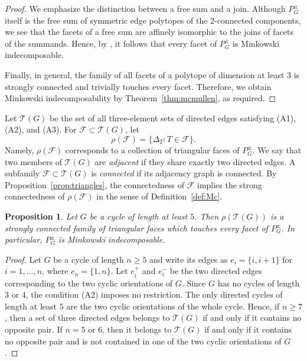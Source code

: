 \documentclass[11pt,a4paper]{amsart}
\newtheorem{proposition}[theorem]{Proposition}
\theoremstyle{definition}
\theoremstyle{remark}
\newcommand{\Tc}{{\mathcal T}}
\newcommand{\Fc}{{\mathcal F}}
\begin{document}
{\begin{proof}
We emphasize the distinction between a free sum and a join. 
Although $P_G^\pm$ itself is the free sum of symmetric edge polytopes of the $2$-connected components, 
we see that the facets of a free sum are affinely isomorphic to the joins of facets of the summands. 
Hence, by \cite[Theorem~3]{McM}, it follows that every facet of $P_G^\pm$ is Minkowski indecomposable. 

Finally, in general, the family of all facets of a polytope of dimension at least $3$ is strongly connected and trivially touches every facet. 
Therefore, we obtain Minkowski indecomposability by Theorem~\ref{thm:mcmullen}, as required.  
\end{proof}


\medskip


Let $\Tc(G)$ be the set of all three-element sets of directed edges satisfying (A1), (A2), and (A3). 
For $\Fc\subset \Tc(G)$, let \[\rho(\Fc)=\{\Delta_T:T\in\Fc\}.\]
Namely, $\rho(\Fc)$ corresponds to a collection of triangular faces of $P_G^\pm$. 
We say that two members of $\Tc(G)$ are \emph{adjacent} if they share exactly two directed edges. 
A subfamily $\Fc\subset \Tc(G)$ is \emph{connected} if its adjacency graph is connected. 
By Proposition~\ref{prop:triangles}, the connectedness of $\Fc$ implies the strong connectedness of $\rho(\Fc)$ in the sense of Definition~\ref{def:Mc}. 
\begin{proposition}\label{prop:cycle}
Let $G$ be a cycle of length at least $5$. Then $\rho(\Tc(G))$ is a strongly connected family of triangular faces which touches every facet of $P_G^{\pm}$. 
In particular, $P_G^{\pm}$ is Minkowski indecomposable. 
\end{proposition}
\begin{proof}
Let $G$ be a cycle of length $n \ge 5$ and write its edges as $e_i=\{i,i+1\}$ for $i=1,\ldots,n$, where $e_n=\{1,n\}$. 
Let $e_i^+$ and $e_i^-$ be the two directed edges corresponding to the two cyclic orientations of $G$. 
Since $G$ has no cycles of length $3$ or $4$, the condition (A2) imposes no restriction. 
The only directed cycles of length at least $5$ are the two cyclic orientations of the whole cycle. 
Hence, if $n \ge 7$, then a set of three directed edges belongs to $\Tc(G)$ if and only if it contains no opposite pair. 
If $n=5$ or $6$, then it belongs to $\Tc(G)$ if and only if it contains no opposite pair and is not contained in one of the two cyclic orientations of $G$. 


\end{proof}}
\end{document}
